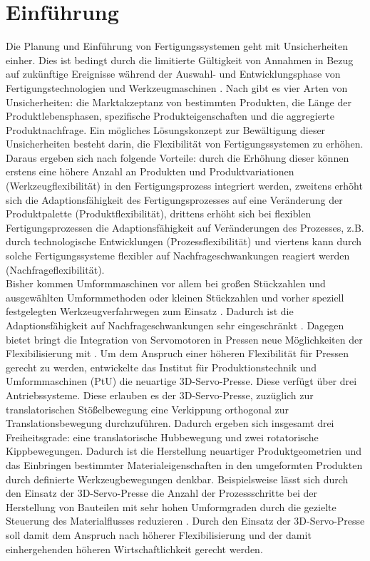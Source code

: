 \chapter{Einführung}

Die Planung und Einführung von Fertigungssystemen geht mit Unsicherheiten einher. Dies ist bedingt durch die limitierte Gültigkeit von Annahmen in Bezug auf zukünftige Ereignisse während der Auswahl- und Entwicklungsphase von Fertigungstechnologien und Werkzeugmaschinen \cite{Groche.2010}. Nach \cite{Gerwin.1993} gibt es vier Arten von Unsicherheiten: die Marktakzeptanz von bestimmten Produkten, die Länge der Produktlebensphasen, spezifische Produkteigenschaften und die aggregierte Produktnachfrage. Ein mögliches Lösungskonzept zur Bewältigung dieser Unsicherheiten besteht darin, die Flexibilität von Fertigungssystemen zu erhöhen. Daraus ergeben sich nach \cite{Son.1987} folgende Vorteile: durch die Erhöhung dieser können erstens eine höhere Anzahl an Produkten und Produktvariationen (Werkzeugflexibilität) in den Fertigungsprozess integriert werden, zweitens erhöht sich die Adaptionsfähigkeit des Fertigungsprozesses auf eine Veränderung der Produktpalette (Produktflexibilität), drittens erhöht sich bei flexiblen Fertigungsprozessen die Adaptionsfähigkeit auf Veränderungen des Prozesses, z.B. durch technologische Entwicklungen (Prozessflexibilität) und viertens kann durch solche Fertigungssysteme flexibler auf Nachfrageschwankungen reagiert werden (Nachfrageflexibilität). \\ 

Bisher kommen Umformmaschinen vor allem bei großen Stückzahlen und ausgewählten Umformmethoden oder kleinen Stückzahlen und vorher speziell festgelegten Werkzeugverfahrwegen zum Einsatz \cite{Groche.2010}. Dadurch ist die Adaptionsfähigkeit auf Nachfrageschwankungen sehr eingeschränkt \cite{Schmoeckel.1991}. Dagegen bietet bringt die Integration von Servomotoren in Pressen neue Möglichkeiten der Flexibilisierung mit \cite{Groche.2004}. Um dem Anspruch einer höheren Flexibilität für Pressen gerecht zu werden, entwickelte das Institut für Produktionstechnik und Umformmaschinen (PtU) die   neuartige 3D-Servo-Presse. Diese verfügt über drei Antriebssysteme. Diese erlauben es der 3D-Servo-Presse, zuzüglich zur translatorischen Stößelbewegung eine Verkippung orthogonal zur Translationsbewegung durchzuführen. Dadurch ergeben sich insgesamt drei Freiheitsgrade: eine translatorische Hubbewegung und zwei rotatorische Kippbewegungen. Dadurch ist die Herstellung neuartiger Produktgeometrien und das Einbringen bestimmter Materialeigenschaften in den umgeformten Produkten durch definierte Werkzeugbewegungen denkbar. Beispielsweise lässt sich durch den Einsatz der 3D-Servo-Presse die Anzahl der Prozessschritte bei der Herstellung von Bauteilen mit sehr hohen Umformgraden durch die gezielte Steuerung des Materialflusses reduzieren \cite{Sinz.2018}. Durch den Einsatz der 3D-Servo-Presse soll damit dem Anspruch nach höherer Flexibilisierung und der damit einhergehenden höheren Wirtschaftlichkeit gerecht werden. \\








